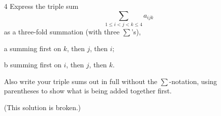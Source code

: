 \documentclass[a4paper,12pt]{article}
\makeatletter
\newtheorem*{solution}{Solution}
\theoremstyle{definition}
\renewenvironment{solution}[1][Solution] {\par\pushQED{\qed}\normalfont\topsep6\p@\@plus6\p@\relax\trivlist\item[\hskip\labelsep\bfseries#1\@addpunct{.}]\ignorespaces}{\popQED\endtrivlist\@endpefalse} \makeatother
\newenvironment{problems}{\begin{list}{}{\renewcommand{\makelabel}[1]{\textbf{##1}\hfil}}}{\end{list}}
\newenvironment{steps}{\begin{list}{}{\renewcommand{\makelabel}[1]{\textbf{##1}\hfil}}}{\end{list}}
\makeatother
\begin{document}
\begin{problems}
\begin{solution}
    \end{solution}
    \item[4] Express the triple sum
    \begin{equation*}
        \sum_{1\leq i<j<k\leq 4}a_{ijk}
    \end{equation*} 
    as a three-fold summation (with three $\sum$'s),
    \begin{steps}
        \item[a] summing first on $k$, then $j$, then $i$;
        \item[b] summing first on $i$, then $j$, then $k$. 
    \end{steps}
    Also write your triple sums out in full without the $\sum$-notation, using parentheses to show what is being added together first.
    \begin{solution}
        (This solution is broken.)

\end{solution}
\end{problems}
\end{document}
